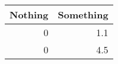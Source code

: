 \begin{tabular}{rr}
    \toprule
    Nothing & Something \tabularnewline 
    \midrule
    0       & 1.1       \tabularnewline
    0       & 4.5       \tabularnewline 
    \bottomrule
\end{tabular}
